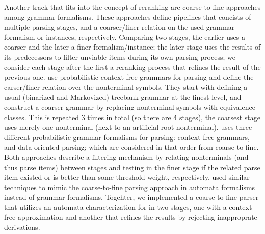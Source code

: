 \documentclass[../../document.tex]{subfiles}
\begin{document}
    Another track that fits into the concept of reranking are coarse-to-fine approaches among grammar formalisms.
    These approaches define pipelines that concists of multiple parsing stages, and a coarser/finer relation on the used grammar formalism or instances, respectively.
    Comparing two stages, the earlier uses a coarser and the later a finer formalism/instance; the later stage uses the results of its predecessors to filter unviable items during its own parsing process; we consider each stage after the first a reranking process that refines the result of the previous one.
    \citet{Cha06} use probabilistic context-free grammars for parsing and define the carser/finer relation over the nonterminal symbols.
    They start with defining a usual (binarized and Markovized) treebank grammar at the finest level, and construct a coarser grammar by replacing nonterminal symbols with equivalence classes.
    This is repeated 3 times in total (so there are 4 stages), the coarsest stage uses merely one nonterminal (next to an artificial root nonterminal).
    \citet{CraSchBod16} uses three different probabilistic grammar formalisms for parsing: context-free grammars,  and data-oriented parsing; which are considered in that order from coarse to fine.
    Both approaches describe a filtering mechanism by relating nonterminals (and thus parse items) between stages and testing in the finer stage if the related parse item existed or is better than some threshold weight, respectively.
    \citet{Denkinger17} used similar techniques to mimic the coarse-to-fine parsing approach in automata formalisms instead of grammar formalisms.
    Togehter, we implemented a coarse-to-fine parser that utilizes an automata characterization for  in two stages, one with a context-free approximation and another that refines the results by rejecting inapproprate derivations. \citep{RupDen19} 
    
\end{document}
